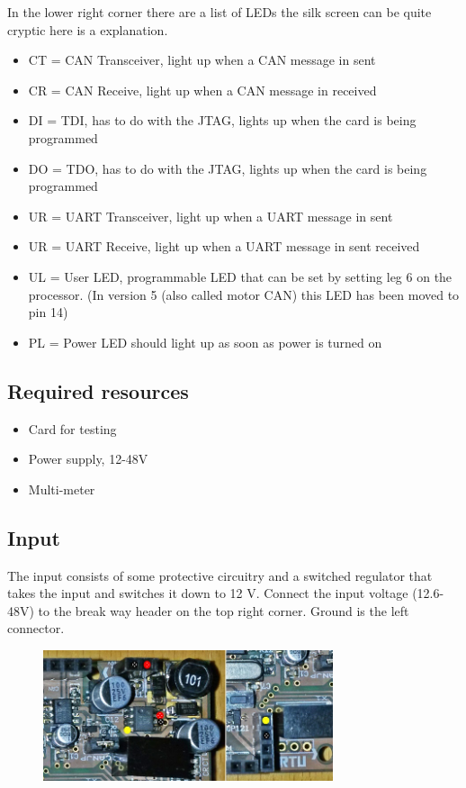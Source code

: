 \noindent In the lower right corner there are a list of LEDs the silk screen can be quite cryptic here is a explanation. 

\begin{itemize}
\item CT = CAN Transceiver, light up when a CAN message in sent
\item CR = CAN Receive, light up when a CAN message in received
\item DI = TDI, has to do with the JTAG, lights up when the card is being programmed
\item DO = TDO, has to do with the JTAG, lights up when the card is being programmed
\item UR = UART Transceiver, light up when a UART message in sent
\item UR = UART Receive, light up when a UART message in sent received
\item UL = User LED, programmable LED that can be set by setting leg 6 on the processor. (In version 5 (also called motor CAN) this LED has been moved to pin 14)
\item PL = Power LED should light up as soon as power is turned on
\end{itemize}

\subsection {Required resources}
\begin{itemize}
\item Card for testing
\item Power supply, 12-48V
\item Multi-meter
\end{itemize}


\newpage
\subsection{Input}
The input consists of some protective circuitry and a switched regulator that takes the input and switches it down to 12 V. Connect the input voltage (12.6-48V) to the break way header on the top right corner. Ground is the left connector. 

\begin{figure}[!ht]
	\begin{center}
		\includegraphics[width=0.76\textwidth]{./Images/Unit-Test-CAN/CAN_input.jpg}
		\label{CAN_input}
	\end{center}
\end{figure}

